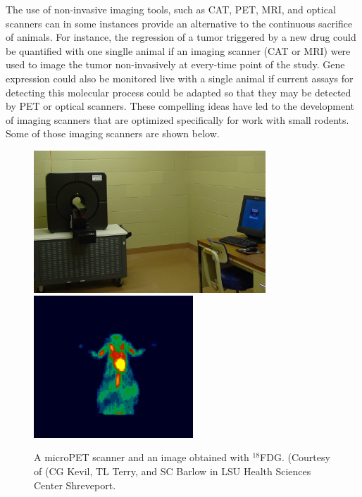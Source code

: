 The use of non-invasive imaging tools, such as CAT, PET, MRI, and optical scanners can in some instances provide an alternative to the continuous sacrifice of animals. For instance, the regression of a tumor triggered by a new drug could be quantified with one singlle animal if an imaging scanner (CAT or MRI) were used to image the tumor non-invasively at every-time point of the study. Gene expression could also be monitored live with a single animal if current assays for detecting this molecular process could be adapted so that they may be detected by PET or optical scanners. These compelling ideas have led to the development of imaging scanners that are optimized specifically for work with small rodents. Some of those imaging scanners are shown below.
\begin{figure}[!htb]
	\centering
	\includegraphics[height=2.1in]{./figures/Topic10/Fig10-18a.png}
	\includegraphics[height=2.1in]{./figures/Topic10/Fig10-18b.png}
	\caption{A microPET scanner and an image obtained with $^{18}$FDG. (Courtesy of (CG Kevil, TL Terry, and SC Barlow in LSU Health Sciences Center Shreveport.}
	\label{Fig10-18}
\end{figure} 	 
